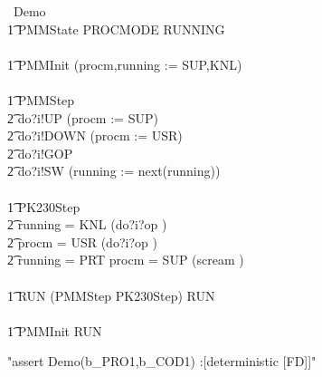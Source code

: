 \begin{circus}
\circprocess\ Demo \circdef \circbegin \\
\t1 \circstate PMMState  PROCMODE \land RUNNING \\
\\
\t1 PMMInit \circdef (procm,running := SUP,KNL) \\
\\
\t1 PMMStep \circdef \\
\t2             do?i!UP \then (procm := SUP) \circseq \Skip \\
\t2 \extchoice  do?i!DOWN \then (procm := USR) \circseq \Skip \\
\t2 \extchoice  do?i!GOP \then \Skip \\
\t2 \extchoice  do?i!SW \then (running := next(running)) \circseq \Skip \\
\\
\t1 PK230Step \circdef \\
\t2 \lcircguard running = KNL \rcircguard \circguard (do?i?op \then \Skip)\\
\t2 \extchoice \lcircguard procm = USR \rcircguard \circguard (do?i?op \then \Skip)\\
\t2 \extchoice \lcircguard running = PRT \land procm = SUP \rcircguard \circguard (scream \then \Stop)\\
\\
\t1 RUN \circdef (PMMStep \interleave PK230Step) \circseq RUN \\
\\
\t1 \circspot PMMInit \circseq RUN \\
\circend
\end{circus}
\begin{assert}
"assert Demo(b_PRO1,b_COD1) :[deterministic [FD]]"
\end{assert}
